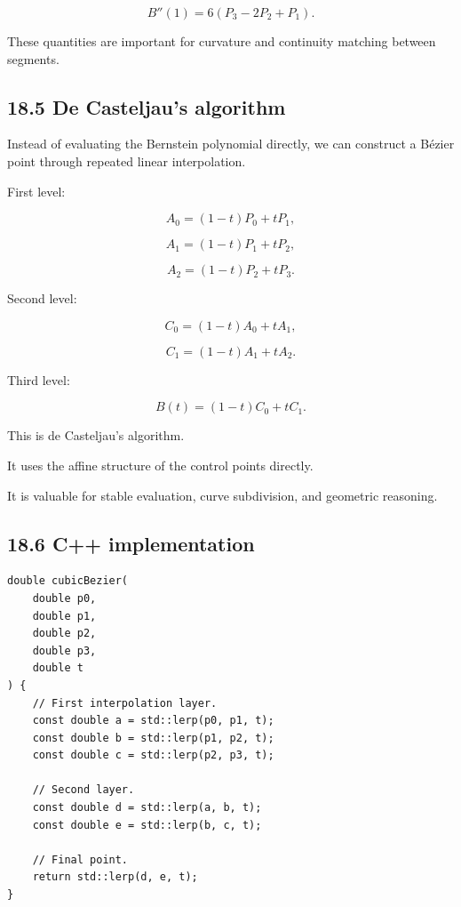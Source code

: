 \[ \boxed{ B''(1)=6(P_3-2P_2+P_1) }. \]

These quantities are important for curvature and continuity matching between segments.

\subsection{18.5 De Casteljau's algorithm}\label{02-foundations-ii-ch028-de-casteljaus-algorithm}

\hypertarget{02-foundations-ii-ch028-de-casteljaus-algorithm}{}

Instead of evaluating the Bernstein polynomial directly, we can construct a Bézier point through repeated linear interpolation.

First level:

\[ A_0=(1-t)P_0+tP_1, \]

\[ A_1=(1-t)P_1+tP_2, \]

\[ A_2=(1-t)P_2+tP_3. \]

Second level:

\[ C_0=(1-t)A_0+tA_1, \]

\[ C_1=(1-t)A_1+tA_2. \]

Third level:

\[ \boxed{ B(t)=(1-t)C_0+tC_1 }. \]

This is de Casteljau's algorithm.

It uses the affine structure of the control points directly.

It is valuable for stable evaluation, curve subdivision, and geometric reasoning.

\subsection{18.6 C++ implementation}\label{02-foundations-ii-ch028-c-implementation}

\hypertarget{02-foundations-ii-ch028-c-implementation}{}

\begin{verbatim}
double cubicBezier(
    double p0,
    double p1,
    double p2,
    double p3,
    double t
) {
    // First interpolation layer.
    const double a = std::lerp(p0, p1, t);
    const double b = std::lerp(p1, p2, t);
    const double c = std::lerp(p2, p3, t);

    // Second layer.
    const double d = std::lerp(a, b, t);
    const double e = std::lerp(b, c, t);

    // Final point.
    return std::lerp(d, e, t);
}
\end{verbatim}

